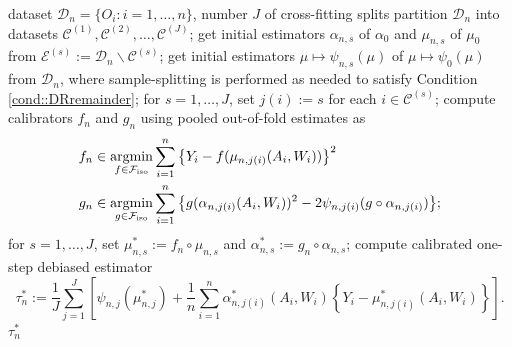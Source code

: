 \documentclass[11pt]{article}
\newcommand{\INPUT}{\item[\textbf{Input:}]}
\theoremstyle{plain}
\DeclareMathOperator*{\argmin}{argmin}
\begin{document}
\begin{algorithm}[!htb]
\begin{algorithmic}[1]
{\small
\caption{Calibrated DML using isotonic calibration} \label{alg:DR}
 \vspace{.1in}
\INPUT dataset $\mathcal{D}_n = \{O_i: i=1,\ldots,n\}$, number $J$ of cross-fitting splits
\vspace{.05in}
\STATE partition $\mathcal{D}_n$ into datasets $\mathcal{C}^{(1)},\mathcal{C}^{(2)},\ldots,\mathcal{C}^{(J)}$;
\STATE get initial estimators $\alpha_{n,s}$ of $\alpha_0$ and $\mu_{n,s}$ of $\mu_0$ from $\mathcal{E}^{(s)} := \mathcal{D}_n \backslash \mathcal{C}^{(s)}$;
\STATE get initial estimators $\mu \mapsto \psi_{n,s}(\mu)$ of $\mu \mapsto \psi_0(\mu)$ from $\mathcal{D}_n$, where sample-splitting is performed as needed to satisfy Condition \ref{cond::DRremainder};
\ENDFOR
\STATE for {$s = 1,\ldots,J$}, set $j(i):=s$ for each $i\in \mathcal{C}^{(s)}$;
\STATE compute calibrators $f_n$ and $g_n$ using pooled out-of-fold estimates as\vspace{-.05in}
\begin{align*}
    f_n &\in \argmin_{f \in \mathcal{F}_{\text{iso}}} \sum_{i=1}^n  \big{\{} Y_i - f(\mu_{n,j(i)}(A_i, W_i))\big{\}}^2\\
    g_n &\in \argmin_{g \in \mathcal{F}_{\text{iso}}} \sum_{i=1}^n\big{\{}g(\alpha_{n,j(i)}(A_i, W_i))^2 - 2\psi_{n,j(i)}(g \circ \alpha_{n,j(i)}) \big{\}};
\end{align*}
\vspace{-.1in}
\STATE for {$s = 1,\ldots,J$}, set $ \mu_{n,s}^* := f_n \circ \mu_{n,s}$ and $ \alpha_{n,s}^* := g_n \circ \alpha_{n,s} $;
 \STATE compute calibrated one-step debiased estimator \vspace{-.05in}
 \begin{equation}
   \label{eqn::crossfitOnestep}  \tau_n^* := \frac{1}{J}\sum_{j=1}^J\left[\psi_{n,j}(\mu_{n,j}^*)  +   \frac{1}{n}\sum_{i=1}^n \alpha_{n,j(i)}^*(A_i,W_i)\left\{Y_i - \mu_{n,j(i)}^*(A_i,W_i)\right\}\right].
\end{equation}\vspace{-.2in}
\RETURN $\tau_n^*$
}
\end{algorithmic}
\vspace{.05in}
\end{algorithm}
\end{document}
